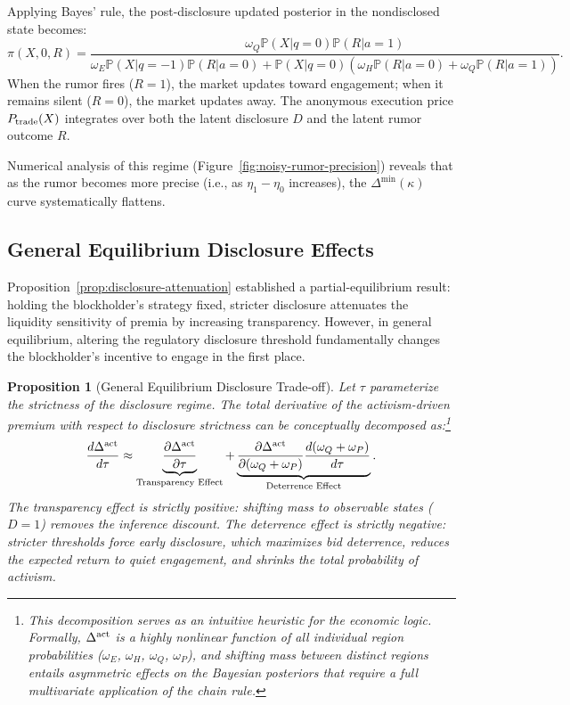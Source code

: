 \documentclass[11pt]{article}
\newtheorem{proposition}{Proposition}
\newcommand{\PP}{\mathbb{P}}
\newcommand{\1}{\mathbf{1}}
\begin{document}
Applying Bayes' rule, the post-disclosure updated posterior in the nondisclosed state becomes:
\begin{equation}
\pi(X,0,R) = \frac{\omega_Q \PP(X|q=0) \PP(R|a=1)}{\omega_E \PP(X|q=-1)\PP(R|a=0) + \PP(X|q=0)(\omega_H \PP(R|a=0) + \omega_Q \PP(R|a=1))}.
\end{equation}
When the rumor fires ($R=1$), the market updates toward engagement; when it remains silent ($R=0$), the market updates away. The anonymous execution price $P_{\textup{trade}}(X)$ integrates over both the latent disclosure $D$ and the latent rumor outcome $R$.

Numerical analysis of this regime (Figure~\ref{fig:noisy-rumor-precision}) reveals that as the rumor becomes more precise (i.e., as $\eta_1 - \eta_0$ increases), the $\Delta^{\min}(\kappa)$ curve systematically flattens.

%
\subsection{General Equilibrium Disclosure Effects}
\label{sec:ge_disclosure}
%

Proposition~\ref{prop:disclosure-attenuation} established a partial-equilibrium result: holding the blockholder's strategy fixed, stricter disclosure attenuates the liquidity sensitivity of premia by increasing transparency. However, in general equilibrium, altering the regulatory disclosure threshold fundamentally changes the blockholder's incentive to engage in the first place.

\begin{proposition}[General Equilibrium Disclosure Trade-off]
\label{prop:ge-disclosure}
Let $\tau$ parameterize the strictness of the disclosure regime. The total derivative of the activism-driven premium with respect to disclosure strictness can be conceptually decomposed as:\footnote{This decomposition serves as an intuitive heuristic for the economic logic. Formally, $\Delta^{\textup{act}}$ is a highly nonlinear function of all individual region probabilities ($\omega_E$, $\omega_H$, $\omega_Q$, $\omega_P$), and shifting mass between distinct regions entails asymmetric effects on the Bayesian posteriors that require a full multivariate application of the chain rule.}
\begin{equation}
\frac{d \Delta^{\textup{act}}}{d \tau} \approx \underbrace{\frac{\partial \Delta^{\textup{act}}}{\partial \tau}}_{\text{Transparency Effect}} + \underbrace{\frac{\partial \Delta^{\textup{act}}}{\partial (\omega_Q + \omega_P)} \frac{d (\omega_Q + \omega_P)}{d \tau}}_{\text{Deterrence Effect}}.
\end{equation}
The transparency effect is strictly positive: shifting mass to observable states ($D=1$) removes the inference discount. The deterrence effect is strictly negative: stricter thresholds force early disclosure, which maximizes bid deterrence, reduces the expected return to quiet engagement, and shrinks the total probability of activism.
\end{proposition}
\end{document}
